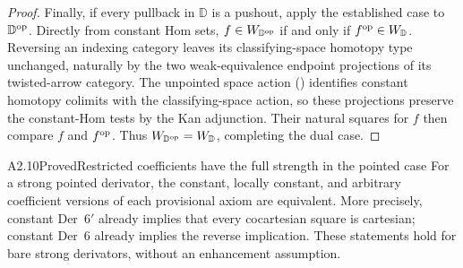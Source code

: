 \begin{proof}
Finally, if every pullback in $\mathbb D$ is a pushout, apply the
established case to $\mathbb D^{\mathrm{op}}$. Directly from constant Hom sets,
$f\in W_{\mathbb D^{\mathrm{op}}}$ if and only if
$f^{\mathrm{op}}\in W_{\mathbb D}$. Reversing an indexing category leaves its
classifying-space homotopy type unchanged, naturally by the two
weak-equivalence endpoint projections of its twisted-arrow category.
The unpointed space action
(\cite[Corollary~3.26]{A2CisinskiKan}) identifies constant homotopy
colimits with the classifying-space action, so these projections preserve
the constant-Hom tests by the Kan adjunction. Their natural squares for
$f$ then compare $f$ and $f^{\mathrm{op}}$.
Thus $W_{\mathbb D^{\mathrm{op}}}=W_{\mathbb D}$, completing the dual case.
\end{proof}

\begin{claim}{A2.10}{Proved}{Restricted coefficients have the full strength in the pointed case}
\label{A2-pointed-coefficients}
For a strong pointed derivator, the constant, locally constant, and arbitrary
coefficient versions of each provisional axiom are equivalent. More precisely,
constant Der~$6'$ already implies that every cocartesian square is cartesian;
constant Der~6 already implies the reverse implication. These statements hold
for bare strong derivators, without an enhancement assumption.
\end{claim}
